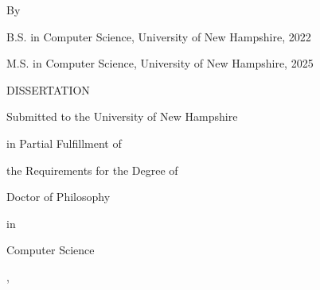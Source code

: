 \thispagestyle{empty}
\begin{center}
  \singlespacing
  \vspace*{0.5in}
  {\large\bfseries \thesistitle\par}
  \vfill
  By\par
  \vfill
  {\large \thesisauthor\par}
  \medskip
  B.S. in Computer Science, University of New Hampshire, 2022\par
  M.S. in Computer Science, University of New Hampshire, 2025\par
  \vfill
  DISSERTATION\par
  \vfill
  Submitted to the University of New Hampshire\par
  in Partial Fulfillment of\par
  the Requirements for the Degree of\par
  \vfill
  Doctor of Philosophy\par
  in\par
  Computer Science\par
  \vfill
  \thesismonth, \thesisyear\par
\end{center}
\clearpage

